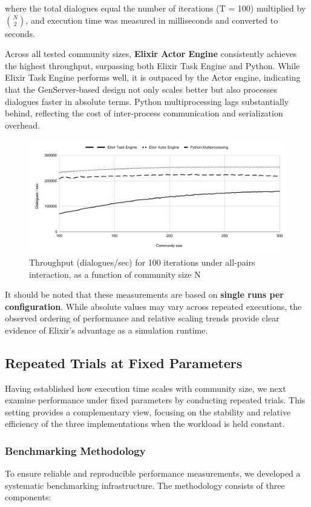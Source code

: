 \documentclass[
]{ceurart}
\begin{document}
where the total dialogues equal the number of iterations (T = 100) multiplied by $\binom{N}{2}$, and execution time was measured in milliseconds and converted to seconds.

Across all tested community sizes, \textbf{Elixir Actor Engine} consistently achieves the highest throughput, surpassing both Elixir Task Engine and Python. While Elixir Task Engine performs well, it is outpaced by the Actor engine, indicating that the GenServer-based design not only scales better but also processes dialogues faster in absolute terms. Python multiprocessing lags substantially behind, reflecting the cost of inter-process communication and serialization overhead.

\begin{figure}
  \centering
  \includegraphics[width=\linewidth]{images/throughput_community_100-300.pdf} %
  \caption{Throughput (dialogues/sec) for 100 iterations under all-pairs interaction, as a function of community size N}
\end{figure}


It should be noted that these measurements are based on \textbf{single runs per configuration}. While absolute values may vary across repeated executions, the observed ordering of performance and relative scaling trends provide clear evidence of Elixir's advantage as a simulation runtime.


\subsection{Repeated Trials at Fixed Parameters}
Having established how execution time scales with community size, we next examine performance under fixed parameters by conducting repeated trials. This setting provides a complementary view, focusing on the stability and relative efficiency of the three implementations when the workload is held constant.

\subsubsection{Benchmarking Methodology}
To ensure reliable and reproducible performance measurements, we developed a systematic benchmarking infrastructure. The methodology consists of three components:
\end{document}
